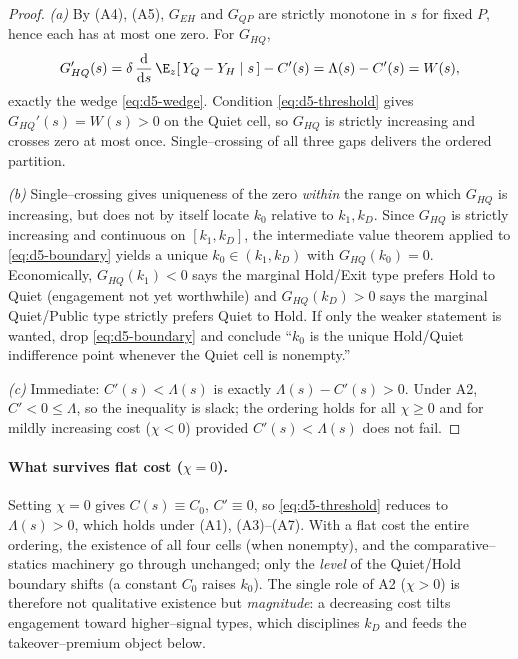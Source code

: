 \begin{proof}
\emph{(a)} By \textup{(A4)}, \textup{(A5)}, $G_{EH}$ and $G_{QP}$ are strictly
monotone in $s$ for fixed $P$, hence each has at most one zero. For $G_{HQ}$,
\[
  G_{HQ}'(s)=\delta\,\frac{\mathrm d}{\mathrm d s}\,
     \E_z[\,Y_Q-Y_H\mid s\,]-C'(s)=\Lambda(s)-C'(s)=W(s),
\]
exactly the wedge \eqref{eq:d5-wedge}. Condition \eqref{eq:d5-threshold} gives
$G_{HQ}'(s)=W(s)>0$ on the Quiet cell, so $G_{HQ}$ is strictly increasing and
crosses zero at most once. Single--crossing of all three gaps delivers the
ordered partition.

\emph{(b)} Single--crossing gives uniqueness of the zero \emph{within} the
range on which $G_{HQ}$ is increasing, but does not by itself locate $k_0$
relative to $k_1,k_D$. Since $G_{HQ}$ is strictly increasing and continuous on
$[k_1,k_D]$, the intermediate value theorem applied to \eqref{eq:d5-boundary}
yields a unique $k_0\in(k_1,k_D)$ with $G_{HQ}(k_0)=0$. Economically,
$G_{HQ}(k_1)<0$ says the marginal Hold/Exit type prefers Hold to Quiet
(engagement not yet worthwhile) and $G_{HQ}(k_D)>0$ says the marginal
Quiet/Public type strictly prefers Quiet to Hold.
If only the weaker statement is wanted, drop \eqref{eq:d5-boundary} and conclude
``$k_0$ is the unique Hold/Quiet indifference point whenever the Quiet cell is
nonempty.''

\emph{(c)} Immediate: $C'(s)<\Lambda(s)$ is exactly $\Lambda(s)-C'(s)>0$. Under
A2, $C'<0\le\Lambda$, so the inequality is slack; the ordering holds for all
$\chi\ge0$ and for mildly increasing cost ($\chi<0$) provided $C'(s)<\Lambda(s)$
does not fail.
\end{proof}

\paragraph{What survives flat cost ($\chi=0$).}
Setting $\chi=0$ gives $C(s)\equiv C_0$, $C'\equiv0$, so
\eqref{eq:d5-threshold} reduces to $\Lambda(s)>0$, which holds under
\textup{(A1)}, \textup{(A3)}--\textup{(A7)}. With a flat cost the entire
ordering, the existence of all four cells (when nonempty), and the
comparative--statics machinery go through unchanged; only the \emph{level} of
the Quiet/Hold boundary shifts (a constant $C_0$ raises $k_0$).
The single role of A2 ($\chi>0$) is therefore not qualitative existence but
\emph{magnitude}: a decreasing cost tilts engagement toward higher--signal
types, which disciplines $k_D$ and feeds the takeover--premium object below.

